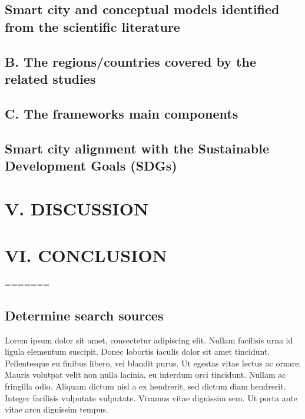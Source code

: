 \documentclass[a4paper,fleqn,spanish]{cas-dc}
\begin{document}
\lipsum[2]


\subsection{Smart city and conceptual models identified from the scientific literature}\label{sci-lit}

\lipsum[3-4]

\subsection{B. The regions/countries covered by the related studies}\label{regiones}

\lipsum[3-4]


\subsection{C. The frameworks main components}\label{componentes}

\lipsum[3-4]


\subsection{Smart city alignment with the Sustainable Development Goals (SDGs)}\label{sustentabilidad}

\lipsum[2-4]

\section{V. DISCUSSION}\label{discusion}

\lipsum[1]


\section{VI. CONCLUSION}\label{conclucion}

\lipsum[2-4]

=======
\subsection{ Determine search sources}\label{fuentes}

Lorem ipsum dolor sit amet, consectetur adipiscing elit. Nullam facilisis urna
id ligula elementum suscipit. Donec lobortis iaculis dolor sit amet tincidunt.
Pellentesque eu finibus libero, vel blandit purus. Ut egestas vitae lectus ac
ornare. Mauris volutpat velit non nulla lacinia, eu interdum orci tincidunt.
Nullam ac fringilla odio. Aliquam dictum nisl a ex hendrerit, sed dictum diam
hendrerit. Integer facilisis vulputate vulputate. Vivamus vitae dignissim sem.
Ut porta ante vitae arcu dignissim tempus.
\end{document}
